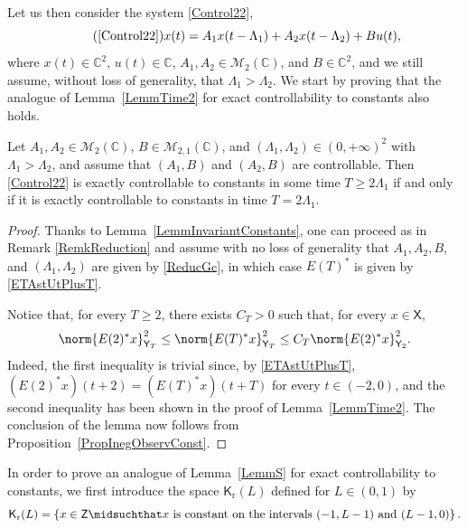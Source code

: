 Let us then consider the system \eqref{Control22}, \ie 
\begin{equation*}
\tag{\ref{Control22}}
x(t) = A_1 x(t - \Lambda_1) + A_2 x(t - \Lambda_2) + B u(t),
\end{equation*}
where $x(t) \in \mathbb C^2$, $u(t) \in \mathbb C$, $A_1, A_2 \in \mathcal M_2(\mathbb C)$, and $B \in \mathbb C^2$, and we still assume, without loss of generality, that $\Lambda_1 > \Lambda_2$. We start by proving that the analogue of Lemma~\ref{LemmTime2} for exact controllability to constants also holds.

\begin{lemm}
\label{LemmContConstTIff2}
Let $A_1, A_2 \in \mathcal M_2(\mathbb C)$, $B \in \mathcal M_{2, 1}(\mathbb C)$, and $(\Lambda_1, \Lambda_2) \in (0, +\infty)^2$ with $\Lambda_1 > \Lambda_2$, and assume that $(A_1, B)$ and $(A_2, B)$ are controllable. Then \eqref{Control22} is exactly controllable to constants in some time $T \geq 2 \Lambda_1$ if and only if it is exactly controllable to constants in time $T = 2 \Lambda_1$.
\end{lemm}

\begin{proof}
Thanks to Lemma~\ref{LemmInvariantConstants}, one can proceed as in Remark \ref{RemkReduction} and assume with no loss of generality that $A_1, A_2, B$, and $(\Lambda_1, \Lambda_2)$ are given by \eqref{ReducGc}, in which case $E(T)^\ast$ is given by \eqref{ETAstUtPlusT}.

Notice that, for every $T \geq 2$, there exists $C_T > 0$ such that, for every $x \in \mathsf X$,
\begin{equation}
\label{EquivE2ET}
\norm{E(2)^\ast x}_{\mathsf Y_T}^2 \leq \norm{E(T)^\ast x}_{\mathsf Y_T}^2 \leq C_T \norm{E(2)^\ast x}_{\mathsf Y_2}^2.
\end{equation}
Indeed, the first inequality is trivial since, by \eqref{ETAstUtPlusT}, $(E(2)^\ast x)(t + 2) = (E(T)^\ast x)(t + T)$ for every $t \in (-2, 0)$, and the second inequality has been shown in the proof of Lemma~\ref{LemmTime2}. The conclusion of the lemma now follows from Proposition~\ref{PropInegObservConst}.
\end{proof}

In order to prove an analogue of Lemma~\ref{LemmS} for exact controllability to constants, we first introduce the space $\mathsf K_{\mathrm r}(L)$ defined for $L \in (0, 1)$ by
\[
\mathsf K_{\mathrm r}(L) = \left\{x \in \mathsf Z \midsuchthat x \text{ is constant on the intervals } (-1, L-1) \text{ and } (L-1, 0)\right\}.
\]

